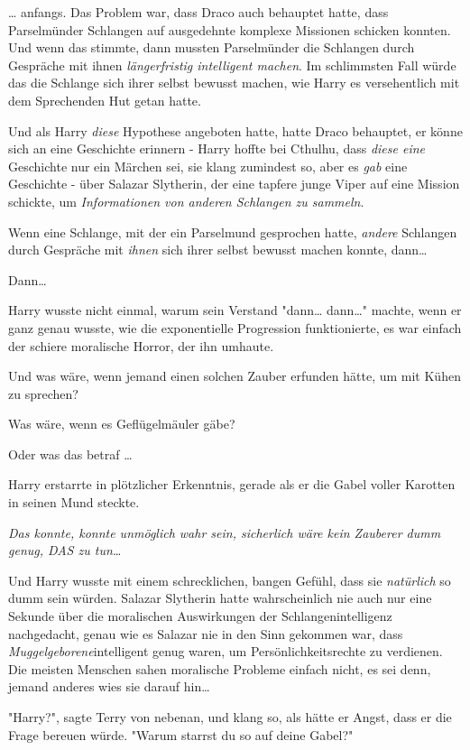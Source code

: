 {… anfangs. Das Problem war, dass Draco auch behauptet hatte, dass Parselmünder Schlangen auf ausgedehnte komplexe Missionen schicken konnten. Und wenn das stimmte, dann mussten Parselmünder die Schlangen durch Gespräche mit ihnen \emph{längerfristig intelligent machen}. Im schlimmsten Fall würde das die Schlange sich ihrer selbst bewusst machen, wie Harry es versehentlich mit dem Sprechenden Hut getan hatte.

Und als Harry \emph{diese} Hypothese angeboten hatte, hatte Draco behauptet, er könne sich an eine Geschichte erinnern - Harry hoffte bei Cthulhu, dass \emph{diese eine} Geschichte nur ein Märchen sei, sie klang zumindest so, aber es \emph{gab} eine Geschichte - über Salazar Slytherin, der eine tapfere junge Viper auf eine Mission schickte, um \emph{Informationen von anderen Schlangen zu sammeln}.

Wenn eine Schlange, mit der ein Parselmund gesprochen hatte, \emph{andere} Schlangen durch Gespräche mit \emph{ihnen} sich ihrer selbst bewusst machen konnte, dann…

Dann…

Harry wusste nicht einmal, warum sein Verstand "dann… dann…" machte, wenn er ganz genau wusste, wie die exponentielle Progression funktionierte, es war einfach der schiere moralische Horror, der ihn umhaute.

Und was wäre, wenn jemand einen solchen Zauber erfunden hätte, um mit Kühen zu sprechen?

Was wäre, wenn es Geflügelmäuler gäbe?

Oder was das betraf …

Harry erstarrte in plötzlicher Erkenntnis, gerade als er die Gabel voller Karotten in seinen Mund steckte.

\emph{Das konnte, konnte unmöglich wahr sein, sicherlich wäre kein Zauberer dumm genug, DAS zu tun…}

Und Harry wusste mit einem schrecklichen, bangen Gefühl, dass sie \emph{natürlich} so dumm sein würden. Salazar Slytherin hatte wahrscheinlich nie auch nur eine Sekunde über die moralischen Auswirkungen der Schlangenintelligenz nachgedacht, genau wie es Salazar nie in den Sinn gekommen war, dass \emph{Muggelgeborene}intelligent genug waren, um Persönlichkeitsrechte zu verdienen. Die meisten Menschen sahen moralische Probleme einfach nicht, es sei denn, jemand anderes wies sie darauf hin…

"Harry?", sagte Terry von nebenan, und klang so, als hätte er Angst, dass er die Frage bereuen würde. "Warum starrst du so auf deine Gabel?"

}
